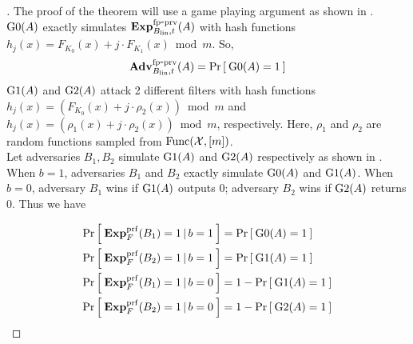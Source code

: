 \begin{proof}[]
The proof of the theorem will use a game playing argument as shown in . $\text{G0}(A)$ exactly simulates $\mathrm{\mathbf{Exp}}^{\mathrm{fp\mbox{-}prv}}_{B_\mathrm{lin},t}(A)$ with hash functions $h_j(x) =  F_{K_0}(x) + j\cdot F_{K_1}(x) \bmod m$. So,
\begin{equation}
\mathrm{\mathbf{Adv}}^{\mathrm{fp\mbox{-}prv}}_{B_{\mathrm{lin}},t}(A) = \Pr\left[\: \text{G0}(A)=1 \:\right]\label{eq:0}
\end{equation}
 $\text{G1}(A)$ and $\text{G2}(A)$ attack 2 different filters with hash functions 
$h_j(x) = ( F_{K_0}(x) + j\cdot \rho_2(x)) \bmod m$ and $h_j(x) = ( \rho_1(x) + j \cdot \rho_2(x)) \bmod m$, respectively.
Here, $\rho_1$ and $\rho_2$ are random functions sampled from $\mathrm{Func}({\cal X},[m])$. \\
\noindent
Let adversaries $B_1, B_2$ simulate $\text{G1}(A)$ and $\text{G2}(A)$ respectively as shown in . When $b=1$, adversaries $B_1$ and $B_2$ exactly simulate $\text{G0}(A)$ and $\text{G1}(A)$.  When $b=0$, adversary $B_1$ wins if $\text{G1}(A)$ outputs 0; adversary $B_2$ wins if $\text{G2}(A)$ returns 0.  Thus we have

\begin{align}
\Pr\left[\: \mathbf{Exp}^{\mathrm{prf}}_{F}(B_1) = 1\,|\,b=1 \:\right] &= \Pr\left[\: \text{G0}(A)=1 \:\right]\label{eq:m1}\\
\Pr\left[\: \mathbf{Exp}^{\mathrm{prf}}_{F}(B_2) = 1\,|\,b=1 \:\right] &= \Pr\left[\: \text{G1}(A)=1 \:\right]\label{eq:m2}\\
\Pr\left[\: \mathbf{Exp}^{\mathrm{prf}}_{F}(B_1) = 1\,|\,b=0 \:\right] &= 1-\Pr\left[\: \text{G1}(A)=1 \:\right]\label{eq:m3}\\
\Pr\left[\: \mathbf{Exp}^{\mathrm{prf}}_{F}(B_2) = 1\,|\,b=0 \:\right] &= 1-\Pr\left[\: \text{G2}(A)=1 \:\right]\label{eq:m4}
\end{align}


\end{proof}
